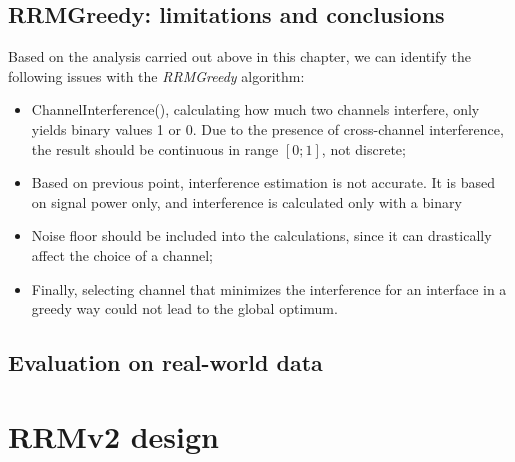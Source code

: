 \subsection{RRMGreedy: limitations and conclusions}
\label{sec:flaws}

Based on the analysis carried out above in this chapter, we can identify the following issues with the \textit{RRMGreedy} algorithm:
\begin{itemize}
    \item ChannelInterference(), calculating how much two channels interfere, only yields binary values 1 or 0. Due to the presence of cross-channel interference, the result should be continuous in range $[0; 1]$, not discrete;
    \item Based on previous point, interference estimation is not accurate. It is based on signal power only, and interference is calculated only with a binary
    \item Noise floor should be included into the calculations, since it can drastically affect the choice of a channel;
    \item Finally, selecting channel that minimizes the interference for an interface in a greedy way could not lead to the global optimum.
\end{itemize}

\subsection{Evaluation on real-world data}
\label{sec:eval}
\section{RRMv2 design}
\label{chap:research:sec:rrmv2}

